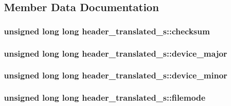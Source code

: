 \subsection{Member Data Documentation}
\subsubsection[{\texorpdfstring{checksum}{checksum}}]{\setlength{\rightskip}{0pt plus 5cm}unsigned long long header\+\_\+translated\+\_\+s\+::checksum}\hypertarget{structheader__translated__s_adae17e48c6e4b2ba5c4fbb662b60506e}{}\label{structheader__translated__s_adae17e48c6e4b2ba5c4fbb662b60506e}
\subsubsection[{\texorpdfstring{device\+\_\+major}{device_major}}]{\setlength{\rightskip}{0pt plus 5cm}unsigned long long header\+\_\+translated\+\_\+s\+::device\+\_\+major}\hypertarget{structheader__translated__s_acc11905fa18c57b91cd81ea230eecced}{}\label{structheader__translated__s_acc11905fa18c57b91cd81ea230eecced}
\subsubsection[{\texorpdfstring{device\+\_\+minor}{device_minor}}]{\setlength{\rightskip}{0pt plus 5cm}unsigned long long header\+\_\+translated\+\_\+s\+::device\+\_\+minor}\hypertarget{structheader__translated__s_a5ea2ccb91566969da9e20e51315e3daa}{}\label{structheader__translated__s_a5ea2ccb91566969da9e20e51315e3daa}
\subsubsection[{\texorpdfstring{filemode}{filemode}}]{\setlength{\rightskip}{0pt plus 5cm}unsigned long long header\+\_\+translated\+\_\+s\+::filemode}\hypertarget{structheader__translated__s_a31c4061cea4a16bde23daf082218b73a}{}\label{structheader__translated__s_a31c4061cea4a16bde23daf082218b73a}
